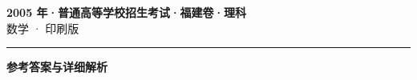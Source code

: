 \documentclass[zihao=5, a4paper]{ctexart}
\begin{document}
\begin{center}
  {\Large\bfseries 2005 年·普通高等学校招生考试·福建卷·理科}\\[4pt]
  {\large 数学 · 印刷版}
\end{center}
\medskip
{}

\par\bigskip\hrule\bigskip
{}
\begin{center}{\large\bfseries 参考答案与详细解析}\end{center}
\smallskip

\end{document}
